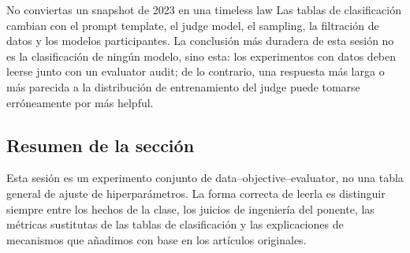 \begin{warningbox}{No conviertas un snapshot de 2023 en una timeless law}
Las tablas de clasificación cambian con el prompt template, el judge model, el sampling, la filtración de datos y los modelos participantes. La conclusión más duradera de esta sesión no es la clasificación de ningún modelo, sino esta: los experimentos con datos deben leerse junto con un evaluator audit; de lo contrario, una respuesta más larga o más parecida a la distribución de entrenamiento del judge puede tomarse erróneamente por más helpful.
\end{warningbox}

\subsection{Resumen de la sección}

Esta sesión es un experimento conjunto de data--objective--evaluator, no una tabla general de ajuste de hiperparámetros. La forma correcta de leerla es distinguir siempre entre los hechos de la clase, los juicios de ingeniería del ponente, las métricas sustitutas de las tablas de clasificación y las explicaciones de mecanismos que añadimos con base en los artículos originales.
